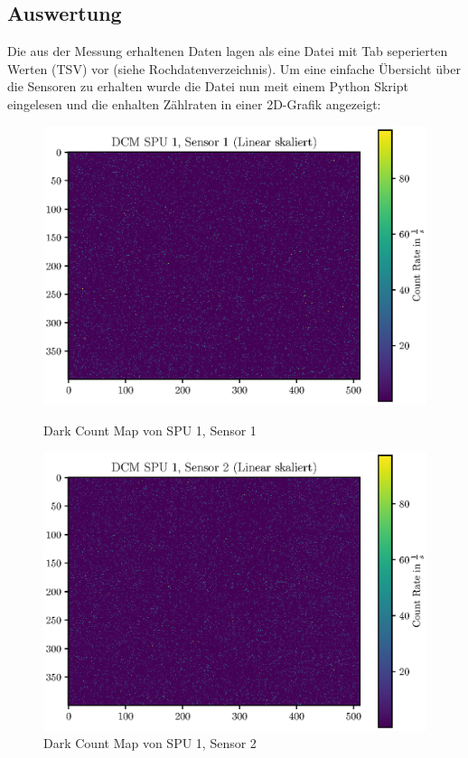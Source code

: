 \documentclass[12pt,twoside,a4paper]{scrartcl}
\begin{document}
		\subsection{Auswertung}

			Die aus der Messung erhaltenen Daten lagen als eine Datei mit Tab seperierten Werten (TSV) vor (siehe Rochdatenverzeichnis). Um eine einfache Übersicht über die Sensoren zu erhalten wurde die Datei nun meit einem Python Skript eingelesen und die enhalten Zählraten in einer 2D-Grafik angezeigt:

			\begin{figure}[H]
				\begin{minipage}{0.49 \textwidth}
					\includegraphics[width = \textwidth]{Plots/DCM/DCM_SPU1_Sensor1_lin.eps}
					\caption{Dark Count Map von SPU 1, Sensor 1}
				\end{minipage}
				\begin{minipage}{0.49 \textwidth}
					\includegraphics[width = \textwidth]{Plots/DCM/DCM_SPU1_Sensor2_lin.eps}
					\caption{Dark Count Map von SPU 1, Sensor 2}
				\end{minipage}
			\end{figure}
\end{document}
